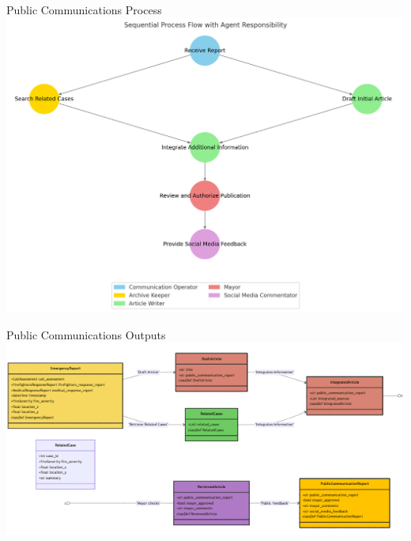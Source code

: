 \begin{frame}{Public Communications Process}
    \centering
    \includegraphics[width=\textwidth]{figures/PC-process.png} 
\end{frame}

\begin{frame}{Public Communications Outputs}
    \centering
    \includegraphics[width=\textwidth]{figures/PC-classDiagram.png}
\end{frame}